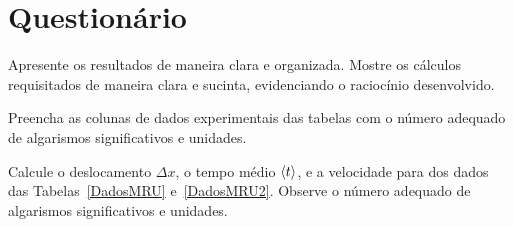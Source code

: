 
\vspace{15mm}

\begin{fullwidth}
\noindent{}
\vspace{5mm}

\noindent{}

\noindent{}

\noindent{}

\noindent{}

\noindent{}
\end{fullwidth}

\vspace{5mm}

\section{Questionário}

\begin{question}[type={exam}]{1}
Apresente os resultados de maneira clara e organizada. Mostre os cálculos requisitados de maneira clara e sucinta, evidenciando o raciocínio desenvolvido.
\end{question}

\begin{question}[type={exam}]{2}
Preencha as colunas de dados experimentais das tabelas com o número adequado de algarismos significativos e unidades.
\end{question}

\begin{question}[type={exam}]{2}
Calcule o deslocamento $\Delta x$, o tempo médio $\left\langle{t}\right\rangle$, e a velocidade para dos dados das Tabelas~\ref{DadosMRU} e~\ref{DadosMRU2}. Observe o número adequado de algarismos significativos e unidades.
\end{question}


